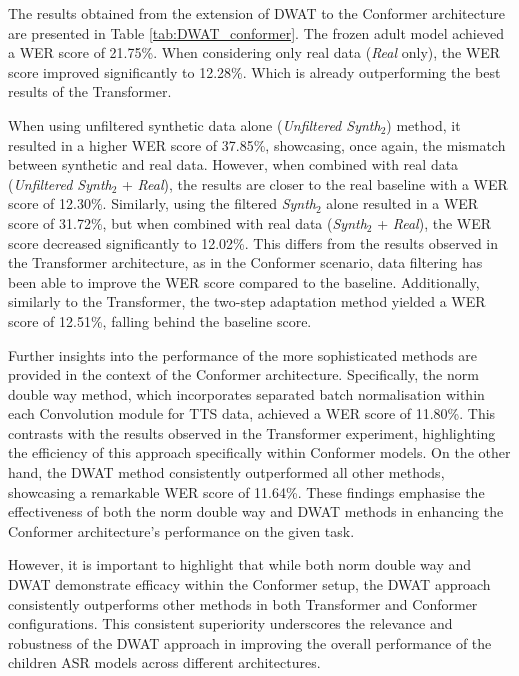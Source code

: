 The results obtained from the extension of \ac{DWAT} to the Conformer architecture are presented in Table \ref{tab:DWAT_conformer}. The frozen adult model achieved a \ac{WER} score of 21.75\%. When considering only real data (\textit{Real} only), the \ac{WER} score improved significantly to 12.28\%. Which is already outperforming the best results of the Transformer.

When using unfiltered synthetic data alone (\textit{Unfiltered Synth$_2$}) method, it resulted in a higher \ac{WER} score of 37.85\%, showcasing, once again, the mismatch between synthetic and real data. However, when combined with real data (\textit{Unfiltered Synth$_2$} + \textit{Real}), the results are closer to the real baseline with a \ac{WER} score of 12.30\%. Similarly, using the filtered \textit{Synth$_2$} alone resulted in a \ac{WER} score of 31.72\%, but when combined with real data (\textit{Synth$_2$} + \textit{Real}), the \ac{WER} score decreased significantly to 12.02\%. This differs from the results observed in the Transformer architecture, as in the Conformer scenario, data filtering has been able to improve the \ac{WER} score compared to the baseline.
Additionally, similarly to the Transformer, the two-step adaptation method yielded a \ac{WER} score of 12.51\%, falling behind the baseline score. 

Further insights into the performance of the more sophisticated methods are provided in the context of the Conformer architecture. Specifically, the norm double way method, which incorporates separated batch normalisation within each Convolution module for \ac{TTS} data, achieved a \ac{WER} score of 11.80\%. This contrasts with the results observed in the Transformer experiment, highlighting the efficiency of this approach specifically within Conformer models. On the other hand, the \ac{DWAT} method consistently outperformed all other methods, showcasing a remarkable \ac{WER} score of 11.64\%. These findings emphasise the effectiveness of both the norm double way and \ac{DWAT} methods in enhancing the Conformer architecture's performance on the given task.

However, it is important to highlight that while both norm double way and \ac{DWAT} demonstrate efficacy within the Conformer setup, the \ac{DWAT} approach consistently outperforms other methods in both Transformer and Conformer configurations. This consistent superiority underscores the relevance and robustness of the \ac{DWAT} approach in improving the overall performance of the children \ac{ASR} models across different architectures.

